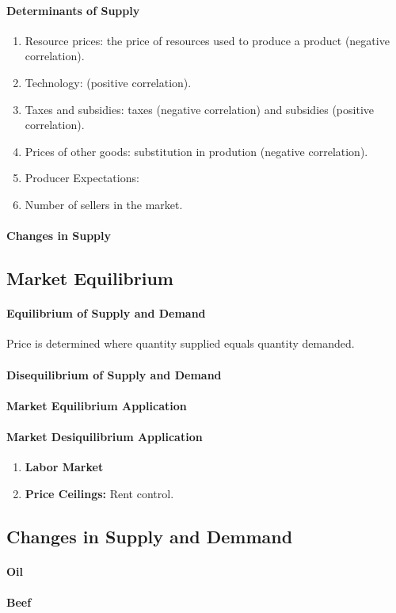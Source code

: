 \paragraph{Determinants of Supply}
\begin{enumerate}[label = \textbullet]
	\item Resource prices: the price of resources used to produce a product (negative correlation).
	\item Technology: (positive correlation).
	\item Taxes and subsidies: taxes (negative correlation) and subsidies (positive correlation).
	\item Prices of other goods: substitution in prodution (negative correlation).
	\item Producer Expectations: 
	\item Number of sellers in the market.
\end{enumerate}
\paragraph{Changes in Supply} %

\subsection{Market Equilibrium}
\paragraph{Equilibrium of Supply and Demand} Price is determined where quantity supplied equals quantity demanded.
\paragraph{Disequilibrium of Supply and Demand}

\paragraph{Market Equilibrium Application} %

\paragraph{Market Desiquilibrium Application}

\begin{enumerate}[label = \textbf{(\Roman*)}]
	\item \textbf{Labor Market}
	\item \textbf{Price Ceilings:} Rent control.	
\end{enumerate}

\subsection{Changes in Supply and Demmand}
\paragraph{Oil}
\paragraph{Beef}
